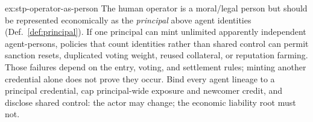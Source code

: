 \documentclass[11pt,a4paper]{article}
\theoremstyle{definition}
\begin{document}
\begin{pdsolution}{ex:stp-operator-as-person}
The human operator is a moral/legal person but should be represented
economically as the \emph{principal} above agent identities
(Def.~\ref{def:principal}). If one principal can mint unlimited apparently
independent agent-persons, policies that count identities rather than shared
control can permit sanction resets, duplicated voting weight, reused collateral,
or reputation farming. Those failures depend on the entry, voting, and
settlement rules; minting another credential alone does not prove they occur. Bind every agent
lineage to a principal credential, cap principal-wide exposure and newcomer
credit, and disclose shared control: the actor may change; the economic
liability root must not.
\end{pdsolution}

\end{document}
